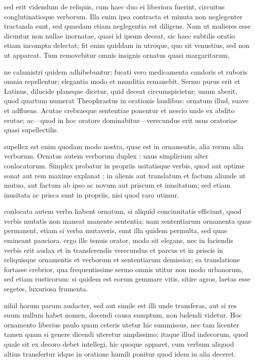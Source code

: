  sed erit videndum de reliquis, cum haec duo ei liberiora fuerint, circuitus conglutinatioque verborum. Illa enim ipsa contracta et minuta non neglegenter tractanda sunt, sed quaedam etiam neglegentia est diligens. Nam ut mulieres esse dicuntur non nullae inornatae, quasi id ipsum deceat, sic haec subtilis oratio etiam incompta delectat; fit enim quiddam in utroque, quo sit venustius, sed non ut appareat. Tum removebitur omnis insignis ornatus quasi margaritarum,

 ne calamistri quidem adhibebuntur; fucati vero medicamenta candoris et ruboris omnia repellentur; elegantia modo et munditia remanebit. Sermo purus erit et Latinus, dilucide planeque dicetur, quid deceat circumspicietur; unum aberit, quod quartum numerat Theophrastus in orationis laudibus: ornatum illud, suave et adfluens. Acutae crebraeque sententiae ponentur et nescio unde ex abdito erutae; ac—quod in hoc oratore dominabitur—verecundus erit usus oratoriae quasi supellectilis.

 supellex est enim quodam modo nostra, quae est in ornamentis, alia rerum alia verborum. Ornatus autem verborum duplex : unus simplicium alter conlocatorum. Simplex probatur in propriis usitatisque verbis, quod aut optime sonat aut rem maxime explanat ; in alienis aut translatum et factum aliunde ut mutuo, aut factum ab ipso ac novum aut priscum et inusitatum; sed etiam inusitata ac prisca sunt in propriis, nisi quod raro utimur.

 conlocata autem verba habent ornatum, si aliquid concinnitatis efficiunt, quod verbis mutatis non maneat manente sententia; nam sententiarum ornamenta quae permanent, etiam si verba mutaveris, sunt illa quidem permulta, sed quae emineant pauciora. ergo ille tenuis orator, modo sit elegans, nec in faciendis verbis erit audax et in transferendis verecundus et parcus et in priscis in reliquisque ornamentis et verborum et sententiarum demissior; ea translatione fortasse crebrior, qua frequentissime sermo omnis utitur non modo urbanorum, sed etiam rusticorum: si quidem est eorum gemmare vitis, sitire agros, laetas esse segetes, luxuriosa frumenta.

 nihil horum parum audacter, sed aut simile est illi unde transferas, aut si res suum nullum habet nomen, docendi causa sumptum, non ludendi videtur. Hoc ornamento liberius paulo quam ceteris utetur hic summissus, nec tam licenter tamen quam si genere dicendi uteretur amplissimo; itaque illud indecorum, quod quale sit ex decoro debet intellegi, hic quoque apparet, cum verbum aliquod altius transfertur idque in oratione humili ponitur quod idem in alia deceret.

